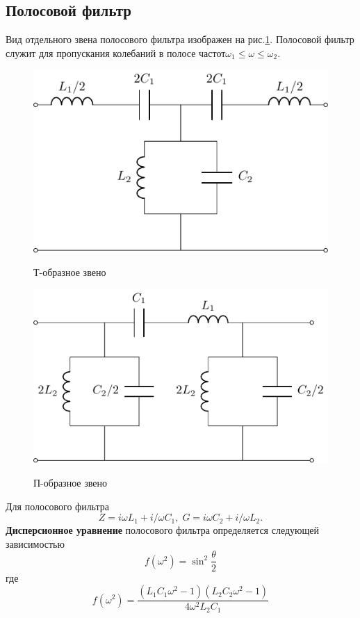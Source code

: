 \subsection{Полосовой фильтр}
Вид отдельного звена полосового фильтра изображен на рис.\ref{fig:7.1}. Полосовой фильтр служит для пропускания колебаний в полосе частот$\omega_1\leq\omega\leq\omega_2$.
\begin{figure}[h!]
	\begin{minipage}{0.49\linewidth}
		\centering
		\includegraphics[scale=0.8]{chem/FF/FFT.pdf}
		\caption*{Т-образное звено}
	\end{minipage}
	\begin{minipage}{0.49\linewidth}
		\centering
		\includegraphics[scale=0.8]{chem/FF/FFP.pdf}
		\caption*{П-образное звено}
	\end{minipage}
	\caption{}
	\label{fig:7.1}
\end{figure}
Для полосового фильтра
\begin{equation}
\label{eq:7.1}
Z=i\omega L_1+i/\omega C_1,\;G=i\omega C_2+i/\omega L_2.
\end{equation}
\textbf{Дисперсионное уравнение} полосового фильтра определяется следующей зависимостью
\begin{equation}
	\label{eq:7.2}
	f(\omega^2)=\sin^2\frac{\theta}{2}
\end{equation}
где
\begin{equation}
	\label{eq:7.3}
	f(\omega^2)=\frac{(L_1C_1\omega^2-1)(L_2C_2\omega^2-1)}{4\omega^2L_2C_1}
\end{equation}

